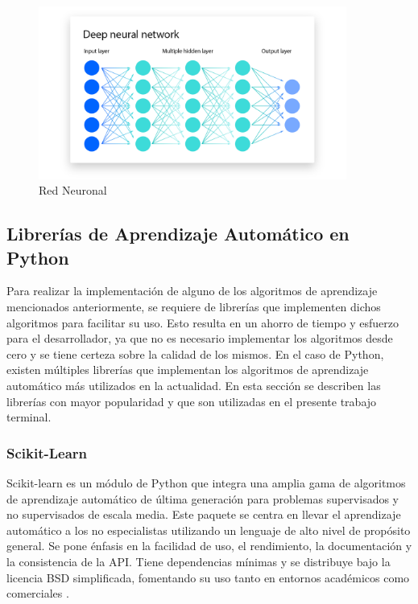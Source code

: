 \begin{figure}[!htbp]
  \centering
  \includegraphics[width=0.9\textwidth]{imagenes/02-marco-teorico/red-neuronal-ibm.png}
  \caption[Red Neuronal]{Red Neuronal \cite{ibm2023redneuronal}}
  \label{fig:red-neuronal-ibm}
\end{figure}

\subsection{Librerías de Aprendizaje Automático en Python}

Para realizar la implementación de alguno de los algoritmos de aprendizaje
mencionados anteriormente, se requiere de librerías que implementen dichos
algoritmos para facilitar su uso. Esto resulta en un ahorro de tiempo y esfuerzo
para el desarrollador, ya que no es necesario implementar los algoritmos desde
cero y se tiene certeza sobre la calidad de los mismos. En el caso de Python,
existen múltiples librerías que implementan los algoritmos de aprendizaje
automático más utilizados en la actualidad. En esta sección se describen las
librerías con mayor popularidad y que son utilizadas en el presente trabajo
terminal.

\subsubsection{Scikit-Learn}

Scikit-learn es un módulo de Python que integra una amplia gama de algoritmos
de aprendizaje automático de última generación para problemas supervisados y no
supervisados de escala media. Este paquete se centra en llevar el aprendizaje
automático a los no especialistas utilizando un lenguaje de alto nivel de propósito
general. Se pone énfasis en la facilidad de uso, el rendimiento, la documentación
y la consistencia de la API. Tiene dependencias mínimas y se distribuye bajo la
licencia BSD simplificada, fomentando su uso tanto en entornos académicos como
comerciales \cite{pedregosa2011scikit}.

